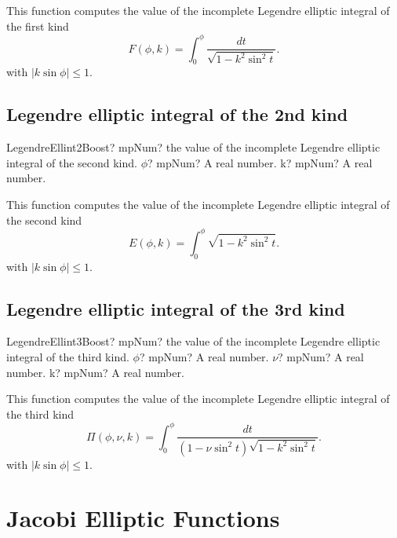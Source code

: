 \vspace{0.3cm}
This function computes the value of the incomplete Legendre elliptic integral of the first kind
\begin{equation}
	F(\phi, k)=\int_0^{\phi} \frac{dt}{\sqrt{1-k^2 \sin^2 t}}.
\end{equation}
with $|k \sin \phi| \leq 1$.



\subsection{Legendre elliptic integral of the 2nd kind}

\begin{mpFunctionsExtract}
	\mpFunctionTwo
	{LegendreEllint2Boost? mpNum? the value of the incomplete Legendre elliptic integral of the second kind.}
	{$\phi$? mpNum? A real number.}
	{k? mpNum? A real number.}
\end{mpFunctionsExtract}

\vspace{0.3cm}
This function computes the value of the incomplete Legendre elliptic integral of the second kind 
\begin{equation}
	E(\phi, k)=\int_0^{\phi} \sqrt{1-k^2 \sin^2 t}.
\end{equation}
with $|k \sin \phi| \leq 1$.



\subsection{Legendre elliptic integral of the 3rd kind}

\begin{mpFunctionsExtract}
	\mpFunctionThree
	{LegendreEllint3Boost? mpNum? the value of the incomplete Legendre elliptic integral of the third kind.}
	{$\phi$? mpNum? A real number.}
	{$\nu$? mpNum? A real number.}
	{k? mpNum? A real number.}
\end{mpFunctionsExtract}

\vspace{0.3cm}
This function computes the value of the incomplete Legendre elliptic integral of the third kind
\begin{equation}
	\Pi(\phi, \nu,k)=\int_0^{\phi} \frac{dt}{(1-\nu \sin^2 t)\sqrt{1-k^2 \sin^2 t}}.
\end{equation}
with $|k \sin \phi| \leq 1$.



\section{Jacobi Elliptic Functions}
\label{EllipticIntegralBoost}

